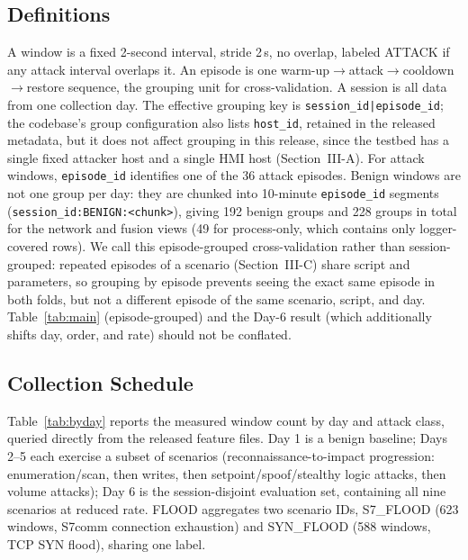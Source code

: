 \documentclass[conference]{IEEEtran}
\begin{document}
\subsection{Definitions}

A window is a fixed 2-second interval, stride 2\,s, no overlap, labeled ATTACK if any attack interval
overlaps it. An episode is one warm-up$\rightarrow$attack$\rightarrow$cooldown$\rightarrow$restore
sequence, the grouping unit for cross-validation. A session is all data from one collection day. The
effective grouping key is \texttt{session\_id|episode\_id}; the codebase's group configuration also lists
\texttt{host\_id}, retained in the released metadata, but it does not affect grouping in this release,
since the testbed has a single fixed attacker host and a single HMI host (Section~III-A). For attack
windows, \texttt{episode\_id} identifies one of the 36 attack episodes. Benign windows are not one group
per day: they are chunked into 10-minute \texttt{episode\_id} segments
(\texttt{session\_id:BENIGN:<chunk>}), giving 192 benign groups and 228 groups in total for the network
and fusion views (49 for process-only, which contains only logger-covered rows). We call this
episode-grouped cross-validation rather than session-grouped: repeated episodes of a scenario
(Section~III-C) share script and parameters, so grouping by episode prevents seeing the exact same episode
in both folds, but not a different episode of the same scenario, script, and day. Table~\ref{tab:main}
(episode-grouped) and the Day-6 result (which additionally shifts day, order, and rate) should not be
conflated.

\subsection{Collection Schedule}

Table~\ref{tab:byday} reports the measured window count by day and attack class, queried directly from
the released feature files. Day 1 is a benign baseline; Days 2--5 each exercise a subset of scenarios
(reconnaissance-to-impact progression: enumeration/scan, then writes, then setpoint/spoof/stealthy logic
attacks, then volume attacks); Day 6 is the session-disjoint evaluation set, containing all nine scenarios
at reduced rate. FLOOD aggregates two scenario IDs, S7\_FLOOD (623 windows, S7comm connection exhaustion)
and SYN\_FLOOD (588 windows, TCP SYN flood), sharing one label.
\end{document}
